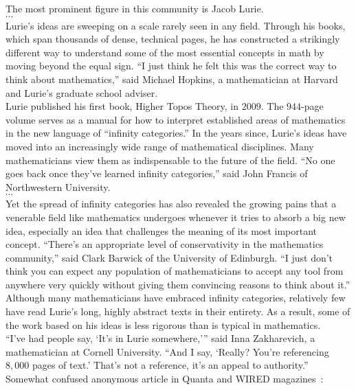 \documentclass[11pt,openany]{book}
\begin{document}
\begin{boxquote}
The most prominent figure in this community is Jacob Lurie. 
\\
$\cdots$
\\
Lurie’s ideas are sweeping on a scale rarely seen in any field. 
Through his books, which span thousands of dense, technical pages, 
he has constructed a strikingly different way to understand some 
of the most essential concepts in math by moving 
beyond the equal sign. 
``I just think he felt this was the correct way to think 
about mathematics,'' said Michael Hopkins, a mathematician 
at Harvard and Lurie’s graduate school adviser.
\\
Lurie published his first book, Higher Topos Theory, in $2009$. 
The $944$-page volume serves as a manual for how 
to interpret established areas of mathematics 
in the new language of ``infinity categories.'' 
In the years since, Lurie’s ideas have moved 
into an increasingly wide range of mathematical disciplines. 
Many mathematicians view them as indispensable 
to the future of the field. ``No one goes back once they’ve learned 
infinity categories,'' said John Francis of Northwestern University.
\\
$\cdots$
\\
Yet the spread of infinity categories has also revealed 
the growing pains that a venerable field 
like mathematics undergoes whenever it tries 
to absorb a big new idea, especially an idea 
that challenges the meaning of its most important concept. 
``There’s an appropriate level of conservativity 
in the mathematics community,'' 
said Clark Barwick of the University of Edinburgh. 
``I just don’t think you can expect 
any population of mathematicians to accept any tool 
from anywhere very quickly without giving them convincing reasons 
to think about it.''
\\
Although many mathematicians have embraced infinity categories, 
relatively few have read Lurie’s long, highly abstract texts 
in their entirety. As a result, some of the work 
based on his ideas is less rigorous than is typical in mathematics.
\\
``I’ve had people say, ‘It’s in Lurie somewhere,’'' 
said Inna Zakharevich, a mathematician at Cornell University. 
``And I say, ‘Really? You’re referencing $8,000$ pages of text.’ 
That’s not a reference, it’s an appeal to authority.''
\tcblower
{Somewhat confused anonymous article in
Quanta and WIRED 
magazines~\cite{hartnett_2019_lurie,quanta_2019_lurie}:}
\end{boxquote}
\end{document}

